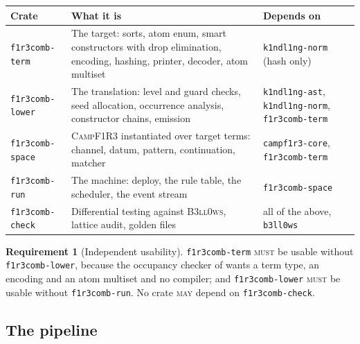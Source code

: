 \documentclass[11pt,a4paper]{article}
\newcommand{\code}[1]{\texttt{#1}}
\newcommand{\Camp}{\textsc{CampF1R3}}
\newcommand{\Bell}{\textsc{B3ll0ws}}
\newcommand{\MUST}{\textsc{must}}
\newcommand{\MAY}{\textsc{may}}
\theoremstyle{definition}
\newtheorem{requirement}[definition]{Requirement}
\theoremstyle{plain}
\begin{document}
\begin{center}
\begin{tabularx}{\linewidth}{@{}l>{\raggedright\arraybackslash}Xl@{}}
\toprule
Crate & What it is & Depends on\\
\midrule
\code{f1r3comb-term} & The target: sorts, atom enum, smart constructors with
drop elimination, encoding, hashing, printer, decoder, atom multiset &
\code{k1ndl1ng-norm} (hash only)\\
\code{f1r3comb-lower} & The translation: level and guard checks, seed
allocation, occurrence analysis, constructor chains, emission &
\code{k1ndl1ng-ast}, \code{k1ndl1ng-norm}, \code{f1r3comb-term}\\
\code{f1r3comb-space} & \Camp{} instantiated over target terms: channel,
datum, pattern, continuation, matcher & \code{campf1r3-core},
\code{f1r3comb-term}\\
\code{f1r3comb-run} & The machine: deploy, the rule table, the scheduler, the
event stream & \code{f1r3comb-space}\\
\code{f1r3comb-check} & Differential testing against \Bell, lattice audit,
golden files & all of the above, \code{b3ll0ws}\\
\bottomrule
\end{tabularx}
\end{center}

\begin{requirement}[Independent usability]\label{req:indep}
\code{f1r3comb-term} \MUST{} be usable without \code{f1r3comb-lower}, because
the occupancy checker of \cite[\S6]{logic} wants a term type, an encoding and
an atom multiset and no compiler; and \code{f1r3comb-lower} \MUST{} be usable
without \code{f1r3comb-run}. No crate \MAY{} depend on
\code{f1r3comb-check}.
\end{requirement}

\subsection{The pipeline}
\end{document}
